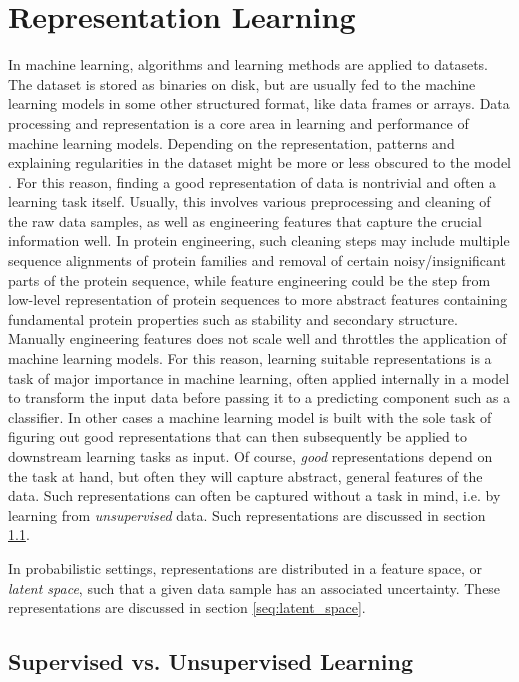 \chapter{Representation Learning}
\label{chapter:representation_learning}
In machine learning, algorithms and learning methods are applied to datasets. The dataset is stored as binaries on disk, but are usually fed to the machine learning models in some other structured format, like data frames or arrays. Data processing and representation is a core area in learning and performance of machine learning models. Depending on the representation, patterns and explaining regularities in the dataset might be more or less obscured to the model \cite{bengio2013representation}. For this reason, finding a good representation of data is nontrivial and often a learning task itself. Usually, this involves various preprocessing and cleaning of the raw data samples, as well as engineering features that capture the crucial information well. In protein engineering, such cleaning steps may include multiple sequence alignments of protein families and removal of certain noisy/insignificant parts of the protein sequence, while feature engineering could be the step from low-level representation of protein sequences to more abstract features containing fundamental protein properties such as stability and secondary structure. Manually engineering features does not scale well and throttles the application of machine learning models. For this reason, learning suitable representations is a task of major importance in machine learning, often applied internally in a model to transform the input data before passing it to a predicting component such as a classifier. In other cases a machine learning model is built with the sole task of figuring out good representations that can then subsequently be applied to downstream learning tasks as input. Of course, \textit{good} representations depend on the task at hand, but often they will capture abstract, general features of the data. Such representations can often be captured without a task in mind, i.e. by learning from \textit{unsupervised} data. Such representations are discussed in section \ref{sec:supervised_vs_unsupervised}. 

In probabilistic settings, representations are distributed in a feature space, or \textit{latent space}, such that a given data sample has an associated uncertainty. These representations are discussed in section \ref{seq:latent_space}.

\section{Supervised vs. Unsupervised Learning}
\label{sec:supervised_vs_unsupervised}

